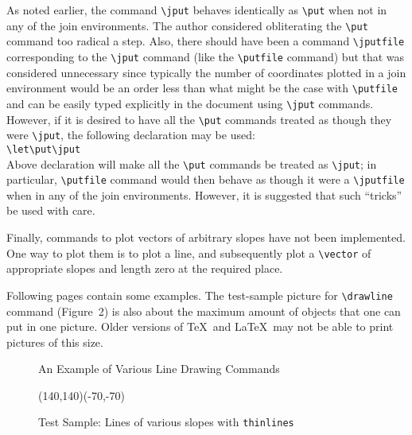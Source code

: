 As noted earlier, the command \verb|\jput| behaves identically as \verb|\put|
when not in any of the join environments. The author considered obliterating
the \verb|\put| command too radical a step. Also, there should have been a
command \verb|\jputfile| corresponding to the \verb|\jput| command (like the
\verb|\putfile| command) but that was considered unnecessary since typically
the number of coordinates plotted in a join environment would be an order
less than what might be the case with \verb|\putfile| and can be easily
typed explicitly in the document using \verb|\jput| commands.
However, if it is desired to have all the \verb|\put| commands treated as
though they were \verb|\jput|, the following declaration may be used:\\
\hspace*{\leftmargin}\verb|\let\put\jput| \\
Above declaration will make all
the \verb|\put| commands be treated as \verb|\jput|; in particular,
\verb|\putfile| command would then behave as though it were a
\verb|\jputfile| when in any of the join environments. However, it is
suggested that such ``tricks'' be used with care.

Finally, commands to plot vectors of arbitrary slopes have not been
implemented. One way to plot them is to plot a line, and subsequently plot a
\verb|\vector| of appropriate slopes and length zero at the required place.

Following pages contain some examples. The test-sample picture for
\verb|\drawline| command (Figure~2) is also about the maximum amount of
objects that one can put in one picture. Older versions of \TeX\ and \LaTeX\
may not be able to print pictures of this size.

\newpage
\begin{figure}[t]
\begin{center}

\end{center}
\caption[]{\normalsize An Example of Various Line Drawing Commands}
\end{figure}

\begin{small}
\end{small}

\newcount\xjunk
\newcount\yjunk

\clearpage
\begin{figure}
\begin{center}
\begin{tiny}
\begin{picture}(140,140)(-70,-70)
\thinlines

\end{picture}
\end{tiny}
\end{center}
\caption[]{\normalsize Test Sample: Lines of various slopes with
{\tt thinlines}}
\end{figure}

